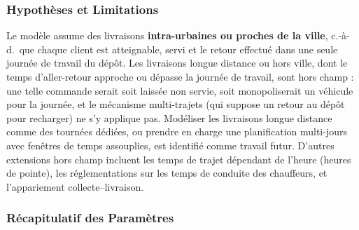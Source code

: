 \documentclass[12pt,a4paper]{report}
\begin{document}
\subsubsection{Hypothèses et Limitations}

Le modèle assume des livraisons \textbf{intra-urbaines ou proches de la
ville}, c.-à-d.\ que chaque client est atteignable, servi et le retour
effectué dans une seule journée de travail du dépôt. Les livraisons longue
distance ou hors ville, dont le temps d'aller-retour approche ou dépasse la
journée de travail, sont hors champ : une telle commande serait soit laissée
non servie, soit monopoliserait un véhicule pour la journée, et le mécanisme
multi-trajets (qui suppose un retour au dépôt pour recharger) ne s'y applique
pas. Modéliser les livraisons longue distance comme des tournées dédiées, ou
prendre en charge une planification multi-jours avec fenêtres de temps
assouplies, est identifié comme travail futur. D'autres extensions hors champ
incluent les temps de trajet dépendant de l'heure (heures de pointe), les
réglementations sur les temps de conduite des chauffeurs, et l'appariement
collecte--livraison.

\subsubsection{Récapitulatif des Paramètres}
\end{document}
